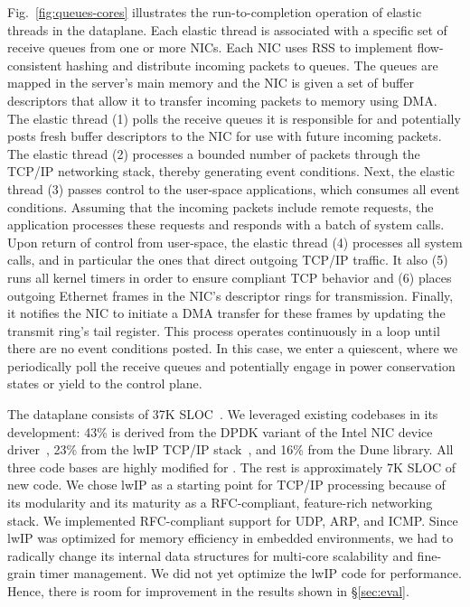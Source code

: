 Fig.~\ref{fig:queues-cores} illustrates the run-to-completion
operation of elastic threads in the \ix dataplane. Each elastic thread
is associated with a specific set of receive queues from one or more
NICs. Each NIC uses RSS to implement flow-consistent hashing and
distribute incoming packets to queues. The queues are mapped in the
server's main memory and the NIC is given a set of buffer descriptors
that allow it to transfer incoming packets to memory using DMA\@.  The
elastic thread (1) polls the receive queues it is responsible for and
potentially posts fresh buffer descriptors to the NIC for use with
future incoming packets. The elastic thread (2) processes a bounded
number of packets through the TCP/IP networking stack, thereby
generating event conditions. Next, the elastic thread (3) passes
control to the user-space applications, which consumes all event
conditions. Assuming that the incoming packets include remote
requests, the application processes these requests and responds with a
batch of system calls. Upon return of control from user-space, the
elastic thread (4) processes all system calls, and in particular the
ones that direct outgoing TCP/IP traffic. It also (5) runs all kernel
timers in order to ensure compliant TCP behavior and (6) places
outgoing Ethernet frames in the NIC's descriptor rings for
transmission. Finally, it notifies the NIC to initiate a DMA transfer
for these frames by updating the transmit ring's tail register.
This process operates continuously in a loop until there are no
event conditions posted. In this case, we enter a quiescent, where
we periodically poll the receive queues and potentially engage
in power conservation states or yield to the control plane.

The \ix dataplane consists of 37K SLOC~\cite{url:sloccount}.  We leveraged existing
codebases in its development: 43\% is derived from the DPDK variant of
the Intel NIC device driver~\cite{intel:dpdk}, 23\% from the lwIP
TCP/IP stack~\cite{dunkels2001design}, and 16\% from the Dune library.
All three code bases are highly modified for \ix. The rest is
approximately 7K SLOC of new code. We chose lwIP as a starting point
for TCP/IP processing because of its modularity and its maturity as a
RFC-compliant, feature-rich networking stack. We implemented
RFC-compliant support for UDP, ARP, and ICMP.
Since lwIP was optimized for memory efficiency in embedded
environments, we had to radically change its internal data structures
for multi-core scalability and fine-grain timer management. We did not
yet optimize the lwIP code for performance. Hence, there is room for
improvement in the results shown in \S\ref{sec:eval}.



